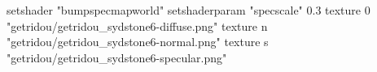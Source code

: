 setshader "bumpspecmapworld"
setshaderparam "specscale" 0.3
texture 0 "getridou/getridou_sydstone6-diffuse.png"
texture n "getridou/getridou_sydstone6-normal.png"
texture s "getridou/getridou_sydstone6-specular.png"
